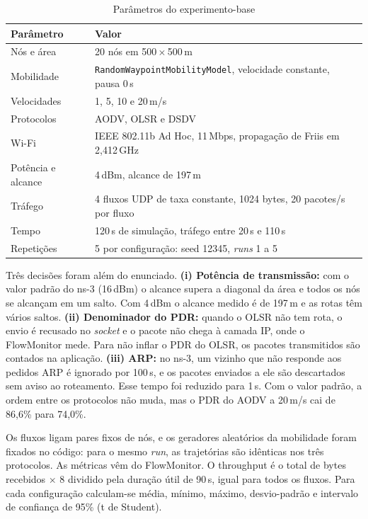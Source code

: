 \documentclass[12pt]{article}
\begin{document}
\begin{table}[ht]
\centering
\caption{Parâmetros do experimento-base}
\label{tab:parametros}
\footnotesize
\begin{tabular}{ll}
\toprule
Parâmetro & Valor \\
\midrule
Nós e área & 20 nós em 500\,$\times$\,500\,m \\
Mobilidade & \texttt{RandomWaypointMobilityModel}, velocidade constante, pausa 0\,s \\
Velocidades & 1, 5, 10 e 20\,m/s \\
Protocolos & AODV, OLSR e DSDV \\
Wi-Fi & IEEE 802.11b Ad Hoc, 11\,Mbps, propagação de Friis em 2,412\,GHz \\
Potência e alcance & 4\,dBm, alcance de 197\,m \\
Tráfego & 4 fluxos UDP de taxa constante, 1024 bytes, 20 pacotes/s por fluxo \\
Tempo & 120\,s de simulação, tráfego entre 20\,s e 110\,s \\
Repetições & 5 por configuração: seed 12345, \emph{runs} 1 a 5 \\
\bottomrule
\end{tabular}
\end{table}

Três decisões foram além do enunciado. \textbf{(i) Potência de transmissão:} com o valor
padrão do ns-3 (16\,dBm) o alcance supera a diagonal da área e todos os nós se alcançam
em um salto. Com 4\,dBm o alcance medido é de 197\,m e as rotas têm vários saltos. \textbf{(ii) Denominador do PDR:} quando o OLSR não tem rota, o envio é
recusado no \emph{socket} e o pacote não chega à camada IP, onde o FlowMonitor
\cite{carneiro2009} mede. Para não inflar o PDR do OLSR, os pacotes transmitidos são
contados na aplicação. \textbf{(iii) ARP:} no ns-3, um vizinho que não responde aos
pedidos ARP é ignorado por 100\,s, e os pacotes enviados a ele são descartados sem aviso
ao roteamento. Esse tempo foi reduzido para 1\,s. Com o valor padrão, a ordem entre os
protocolos não muda, mas o PDR do AODV a 20\,m/s cai de 86,6\% para 74,0\%.

Os fluxos ligam pares fixos de nós, e os geradores aleatórios da mobilidade foram fixados
no código: para o mesmo \emph{run}, as trajetórias são idênticas nos três protocolos. As
métricas vêm do FlowMonitor. O throughput é o total de bytes recebidos $\times$ 8 dividido
pela duração útil de 90\,s, igual para todos os fluxos. Para cada configuração
calculam-se média, mínimo, máximo, desvio-padrão e intervalo de confiança de 95\% (t de
Student).
\end{document}
